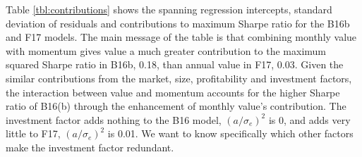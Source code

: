 
Table \ref{tbl:contributions} shows the spanning regression intercepts, standard deviation
of residuals and contributions to maximum Sharpe ratio for the B16b and F17 models. The
main message of the table is that combining monthly value with momentum gives value a much
greater contribution to the maximum squared Sharpe ratio in B16b, 0.18, than annual value
in F17, 0.03. Given the similar contributions from the market, size, profitability and
investment factors, the interaction between value and momentum accounts for the higher
Sharpe ratio of B16(b) through the enhancement of monthly value's contribution. The
investment factor adds nothing to the B16 model, $(a/\sigma_e)^2$ is 0, and adds very
little to F17, $(a/\sigma_e)^2$ is 0.01. We want to know specifically which other factors
make the investment factor redundant.


